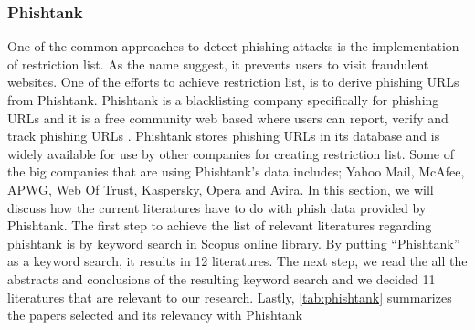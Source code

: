 \subsubsection{Phishtank}

One of the common approaches to detect phishing attacks is the implementation
of restriction list. As the name suggest, it prevents users to visit
fraudulent websites. One of the efforts to achieve restriction list,
is to derive phishing URLs from Phishtank. Phishtank is a blacklisting
company specifically for phishing URLs and it is a free community
web based where users can report, verify and track phishing URLs \citep{phishtank}.
Phishtank stores phishing URLs in its database and is widely available
for use by other companies for creating restriction list. Some of
the big companies that are using Phishtank\textquoteright s data includes;
Yahoo Mail, McAfee, APWG, Web Of Trust, Kaspersky, Opera and Avira.
In this section, we will discuss how the current literatures have
to do with phish data provided by Phishtank. The first step to achieve
the list of relevant literatures regarding phishtank is by keyword
search in Scopus online library. By putting ``Phishtank'' as a keyword
search, it results in 12 literatures. The next step, we read the all
the abstracts and conclusions of the resulting keyword search and
we decided 11 literatures that are relevant to our research. Lastly,
\autoref{tab:phishtank} summarizes the papers selected and its relevancy
with Phishtank

